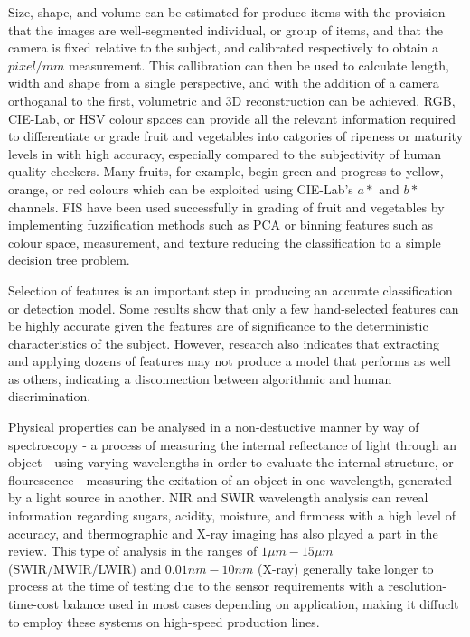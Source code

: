 \documentclass[fleqn,twoside,12pt]{report}
\begin{document}
Size, shape, and volume can be estimated for produce items with the provision that the images are well-segmented individual, or group of items, and that the camera is fixed relative to the subject, and calibrated respectively to obtain a $pixel/mm$ measurement. This callibration can then be used to calculate length, width and shape from a single perspective, and with the addition of a camera orthoganal to the first, volumetric and 3D reconstruction can be achieved. RGB, CIE-Lab, or HSV colour spaces can provide all the relevant information required to differentiate or grade fruit and vegetables into catgories of ripeness or maturity levels in with high accuracy, especially compared to the subjectivity of human quality checkers. Many fruits, for example, begin green and progress to yellow, orange, or red colours which can be exploited using CIE-Lab's $a*$ and $b*$ channels. FIS have been used successfully in grading of fruit and vegetables by implementing fuzzification methods such as PCA or binning features such as colour space, measurement, and texture reducing the classification to a simple decision tree problem.  

Selection of features is an important step in producing an accurate classification or detection model. Some results show that only a few hand-selected features can be highly accurate given the features are of significance to the deterministic characteristics of the subject. However, research also indicates that extracting and applying dozens of features may not produce a model that performs as well as others, indicating a disconnection between algorithmic and human discrimination.

Physical properties can be analysed in a non-destuctive manner by way of spectroscopy - a process of measuring the internal reflectance of light through an object - using varying wavelengths in order to evaluate the internal structure, or flourescence - measuring the exitation of an object in one wavelength, generated by a light source in another. NIR and SWIR wavelength analysis can reveal information regarding sugars, acidity, moisture, and firmness with a high level of accuracy, and thermographic and X-ray imaging has also played a part in the review. This type of analysis in the ranges of $1\mu m-15\mu m$ (SWIR/MWIR/LWIR) and $0.01nm-10nm$ (X-ray) generally take longer to process at the time of testing due to the sensor requirements with a resolution-time-cost balance used in most cases depending on application, making it diffuclt to employ these systems on high-speed production lines.  
\end{document}
